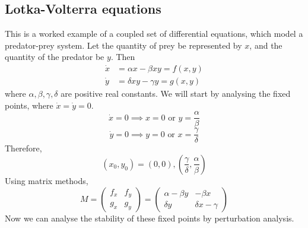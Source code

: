 \subsection{Lotka-Volterra equations}
This is a worked example of a coupled set of differential equations, which model a predator-prey system.
Let the quantity of prey be represented by \(x\), and the quantity of the predator be \(y\).
Then
\begin{align*}
	\dot x & = \alpha x - \beta xy = f(x, y) \\
	\dot y & = \delta xy - \gamma y = g(x,y)
\end{align*}
where \(\alpha, \beta, \gamma, \delta\) are positive real constants.
We will start by analysing the fixed points, where \(\dot x = \dot y = 0\).
\[
	\dot x = 0 \implies x=0 \text{ or } y = \frac{\alpha}{\beta}
\]
\[
	\dot y = 0 \implies y=0 \text{ or } x = \frac{\gamma}{\delta}
\]
Therefore,
\[
	(x_0, y_0) = (0, 0), \left( \frac{\gamma}{\delta}, \frac{\alpha}{\beta} \right)
\]
Using matrix methods,
\[
	M = \begin{pmatrix}
		f_x & f_y \\
		g_x & g_y
	\end{pmatrix} = \begin{pmatrix}
		\alpha - \beta y & -\beta x          \\
		\delta y         & \delta x - \gamma
	\end{pmatrix}
\]
Now we can analyse the stability of these fixed points by perturbation analysis.
